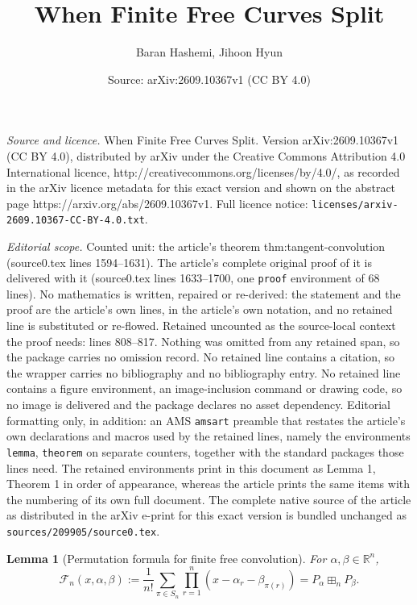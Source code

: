 \documentclass[10pt,a4paper]{amsart}
\title{When Finite Free Curves Split}
\author{Baran Hashemi, Jihoon Hyun}
\date{Source: arXiv:2609.10367v1 (CC BY 4.0)}
\newtheorem{lemma}{Lemma}
\newcommand{\R}{\mathbb R}
\begin{document}
\maketitle

\noindent\emph{Source and licence.} When Finite Free Curves Split. Version arXiv:2609.10367v1 (CC BY 4.0), distributed by arXiv under the Creative Commons Attribution 4.0 International licence, http://creativecommons.org/licenses/by/4.0/, as recorded in the arXiv licence metadata for this exact version and shown on the abstract page https://arxiv.org/abs/2609.10367v1. Full licence notice: \texttt{licenses/arxiv-2609.10367-CC-BY-4.0.txt}.\par\smallskip

\noindent\textit{Editorial scope.} Counted unit: the article's theorem thm:tangent-convolution (source0.tex lines 1594--1631). The article's complete original proof of it is delivered with it (source0.tex lines 1633--1700, one \texttt{proof} environment of 68 lines). No mathematics is written, repaired or re-derived: the statement and the proof are the article's own lines, in the article's own notation, and no retained line is substituted or re-flowed.  Retained uncounted as the source-local context the proof needs: lines 808--817.  Nothing was omitted from any retained span, so the package carries no omission record.  No retained line contains a citation, so the wrapper carries no bibliography and no bibliography entry.  No retained line contains a figure environment, an image-inclusion command or drawing code, so no image is delivered and the package declares no asset dependency.  Editorial formatting only, in addition: an AMS \texttt{amsart} preamble that restates the article's own declarations and macros used by the retained lines, namely the environments \texttt{lemma}, \texttt{theorem} on separate counters, together with the standard packages those lines need.  The retained environments print in this document as Lemma 1, Theorem 1 in order of appearance, whereas the article prints the same items with the numbering of its own full document.  The complete native source of the article as distributed in the arXiv e-print for this exact version is bundled unchanged as \texttt{sources/209905/source0.tex}.
\begin{lemma}[Permutation formula for finite free convolution]
\label{lem:permutation-formula}
For \(\alpha,\beta\in\R^n\),
\begin{equation}\label{eq:hyperbolic-F}
 \mathcal F_n(x,\alpha,\beta)
 :=\frac1{n!}\sum_{\pi\in S_n}
 \prod_{r=1}^n(x-\alpha_r-\beta_{\pi(r)})
 =P_\alpha\boxplus_nP_\beta.
\end{equation}
\end{lemma}
\end{document}
